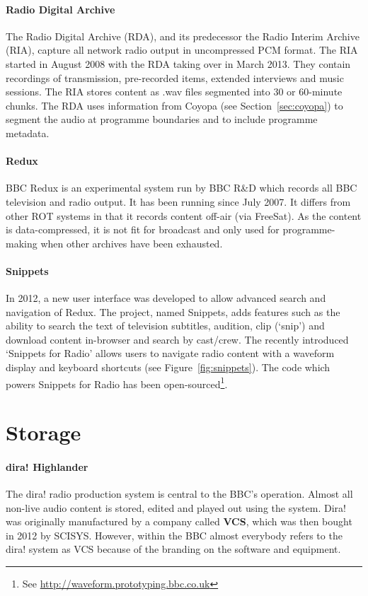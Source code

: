 \paragraph{Radio Digital Archive}
The Radio Digital Archive (RDA), and its predecessor the Radio Interim Archive
(RIA), capture all network radio output in uncompressed PCM format. The RIA
started in August 2008 with the RDA taking over in March 2013. They contain
recordings of transmission, pre-recorded items, extended interviews and music
sessions. The RIA stores content as .wav files segmented into 30 or 60-minute
chunks. The RDA uses information from Coyopa (see Section~\ref{sec:coyopa})  to
segment the audio at programme boundaries and to include programme metadata.

\paragraph{Redux}
BBC Redux is an experimental system run by BBC R\&D which records all BBC
television and radio output. It has been running since July 2007. It differs
from other ROT systems in that it records content off-air (via FreeSat). As the
content is data-compressed, it is not fit for broadcast and only used for
programme-making when other archives have been exhausted.

\paragraph{Snippets}
In 2012, a new user interface was developed to allow advanced search and
navigation of Redux. The project, named Snippets, adds features such as the
ability to search the text of television subtitles, audition, clip (`snip') and
download content in-browser and search by cast/crew. The recently introduced
`Snippets for Radio' allows users to navigate radio content with a waveform
display and keyboard shortcuts (see Figure~\ref{fig:snippets}). The code which
powers Snippets for Radio has been open-sourced\footnote{See
  \url{http://waveform.prototyping.bbc.co.uk}}.

\section{Storage}

\paragraph{dira! Highlander}
The dira! radio production system is central to the BBC's operation. Almost all
non-live audio content is stored, edited and played out using the system. Dira!
was originally manufactured by a company called \textbf{VCS}, which was then
bought in 2012 by SCISYS. However, within the BBC almost everybody refers to
the dira! system as VCS because of the branding on the software and equipment.

